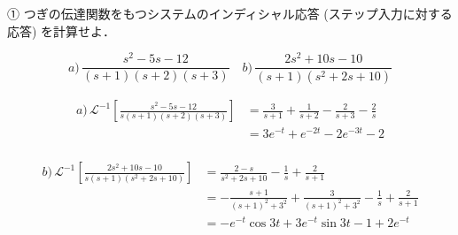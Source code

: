 ① つぎの伝達関数をもつシステムのインディシャル応答 (ステップ入力に対する応答) を計算せよ．

$$
a)\,\frac{s^2-5 s-12}{(s+1)(s+2)(s+3)}\quad
b)\,\frac{2 s^2+10 s-10}{(s+1)\left(s^2+2 s+10\right)}
$$

\begin{align*}
    a)\,\mathcal{L}^{-1}[\frac{s^2-5s-12}{s(s+1)(s+2)(s+3)}]
    &=\frac{3}{s+1}+\frac{1}{s+2}-\frac{2}{s+3}-\frac{2}{s} \\
    &=3e^{-t}+e^{-2t}-2e^{-3t}-2 \\
\end{align*}

\begin{align*}
    b)\,\mathcal{L}^{-1}[\frac{2s^2+10s-10}{s(s+1)(s^2+2s+10)}]
    &=\frac{2-s}{s^2+2s+10}-\frac{1}{s}+\frac{2}{s+1} \\
    &=-\frac{s+1}{(s+1)^2+3^2}+\frac{3}{(s+1)^2+3^2}-\frac{1}{s}+\frac{2}{s+1} \\
    &=-e^{-t}\cos3t+3e^{-t}\sin3t-1+2e^{-t} \\
\end{align*}